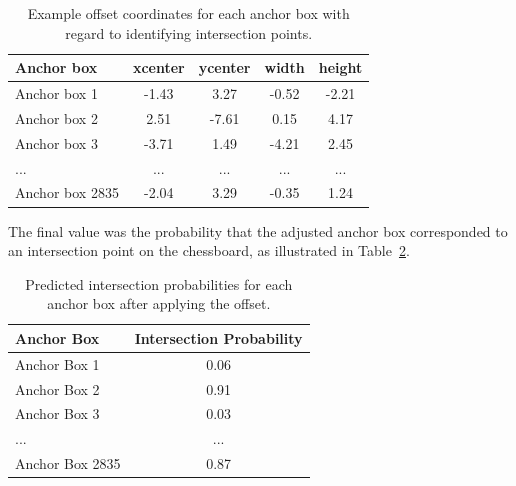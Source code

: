 \begin{table}[h]
    \centering
    \caption[Example offset values for anchor box, intersection points]{Example offset coordinates for each anchor box with regard to identifying intersection points.}  %
    \renewcommand{\arraystretch}{1.3} %
    \begin{tabular}{lcccc}
        \toprule
        \textbf{Anchor box} & \textbf{xcenter} & \textbf{ycenter} & \textbf{width} & \textbf{height} \\
        \midrule
        Anchor box 1 & -1.43 & 3.27 & -0.52 & -2.21 \\
        Anchor box 2 & 2.51 & -7.61 & 0.15 & 4.17 \\
        Anchor box 3 & -3.71 & 1.49 & -4.21 & 2.45 \\
        ... & ... & ... & ... & ... \\
        Anchor box 2835 & -2.04 & 3.29 & -0.35 & 1.24 \\
        \bottomrule
    \end{tabular}
    \label{tab:corner-offset-table}
\end{table}

The final value was the probability that the adjusted anchor box corresponded to an intersection point on the chessboard, as illustrated in Table~\ref{tab:corner-probability-table}. \\

\begin{table}[h]
    \centering
    \caption[Predicted intersection points after applying offset]{Predicted intersection probabilities for each anchor box after applying the offset.}
    \renewcommand{\arraystretch}{1.3}
    \begin{tabular}{lc}
        \toprule
        \textbf{Anchor Box} & \textbf{Intersection Probability} \\
        \midrule
        Anchor Box 1 & 0.06 \\
        Anchor Box 2 & 0.91 \\
        Anchor Box 3 & 0.03 \\
        ... & ... \\
        Anchor Box 2835 & 0.87 \\
        \bottomrule
    \end{tabular}
    \label{tab:corner-probability-table}
\end{table}




